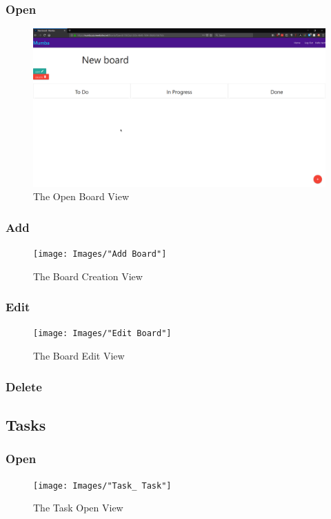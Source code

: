 \documentclass[letterpaper]{article}
\begin{document}
\subsubsection{Open}
\begin{figure}[H]
  \centering
  \caption{The Open Board View}
  \includegraphics[scale=0.2]{Images/BlankBoard}
\end{figure}
\subsubsection{Add}
\begin{figure}[H]
  \centering
  \caption{The Board Creation View}
  \texttt{[image: Images/"Add Board"]}
\end{figure}
\subsubsection{Edit}
\begin{figure}[H]
  \centering
  \caption{The Board Edit View}
  \texttt{[image: Images/"Edit Board"]}
\end{figure}
\subsubsection{Delete}

\subsection{Tasks}

\subsubsection{Open}
\begin{figure}[H]
  \centering
  \caption{The Task Open View}
  \texttt{[image: Images/"Task\_ Task"]}
\end{figure}
\end{document}
